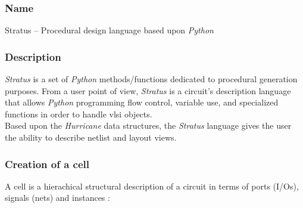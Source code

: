 \subsubsection{Name}

Stratus -- Procedural design language based upon \emph{Python}

\subsubsection{Description}

\emph{Stratus} is a set of \emph{Python} methods/functions dedicated to procedural generation purposes. From a user point of view, \emph{Stratus} is a circuit's description  language that allows \emph{Python} programming flow control, variable use, and specialized functions in order to handle vlsi objects.\\

\indent Based upon the \emph{Hurricane} data structures, the \emph{Stratus} language gives the user the ability to describe netlist and layout views.

\subsubsection{Creation of a cell}

A cell is a hierachical structural description of a circuit in terms of ports (I/Os), signals (nets) and instances :

